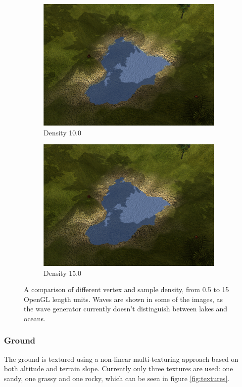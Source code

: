 \begin{figure}[H]
\begin{subfigure}{.5\textwidth}
  \centering
  \includegraphics[width=0.9\linewidth]{images/terrainDensityComparison1_10.jpg}
  \caption{Density 10.0}
  \label{fig:textureDensity10}
\end{subfigure}%
\begin{subfigure}{.5\textwidth}
  \centering
  \includegraphics[width=0.9\linewidth]{images/terrainDensityComparison1_15.jpg}
  \caption{Density 15.0}
  \label{fig:textureDensity15}
\end{subfigure}%
  \caption{A comparison of different vertex and sample density, from 0.5 to 15 OpenGL length units. Waves are shown in some of the images, as the wave generator currently doesn't distinguish between lakes and oceans.}
  \label{fig:textureDensityComparison1}
\end{figure}

\newpage
\subsubsection{Ground}
The ground is textured using a non-linear multi-texturing approach based on both altitude and terrain slope. Currently only three textures are used: one sandy, one grassy and one rocky, which can be seen in figure \ref{fig:textures}.

